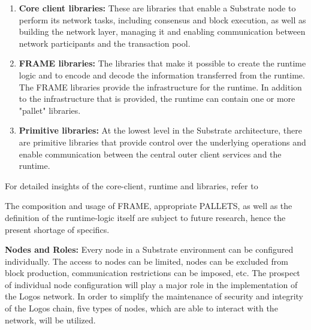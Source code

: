 \documentclass[]{article}
\begin{document}
\begin{enumerate}[label=\textbullet]
	\item\textbf{Core client libraries:}
    These are libraries that enable a Substrate node to perform its network tasks, including consensus and block execution, as well as building the network layer, managing it and enabling communication between network participants and the transaction pool. 
	
	\item\textbf{FRAME libraries:} 
    The libraries that make it possible to create the runtime logic and to encode and decode the information transferred from the runtime.
    The FRAME libraries provide the infrastructure for the runtime.
    In addition to the infrastructure that is provided, the runtime can contain one or more "pallet" libraries.    
	
	\item\textbf{Primitive libraries:} 
	At the lowest level in the Substrate architecture, there are primitive libraries that provide control over the underlying operations and enable communication between the central outer client services and the runtime.	
\end{enumerate}
For detailed insights of the core-client, runtime and libraries, refer to \cite{SubstrateDoc-arch}

The composition and usage of FRAME, appropriate PALLETS, as well as the definition of the runtime-logic itself are subject to future research, hence the present shortage of specifics.
\newline

\textbf{Nodes and Roles:}
Every node in a Substrate environment can be configured individually. 
The access to nodes can be limited, nodes can be excluded from block production, communication restrictions can be imposed, etc.
The prospect of individual node configuration will play a major role in the implementation of the Logos network.
In order to simplify the maintenance of security and integrity of the Logos chain, five types of nodes, which are able to interact with the network, will be utilized. 
\end{document}
